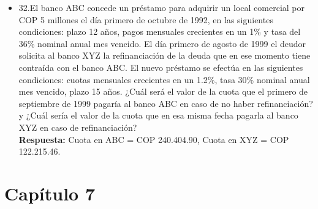 \begin{itemize}
 \item 32.El banco ABC concede un préstamo para adquirir un local comercial por COP 5 millones el día primero de octubre de 1992, en las siguientes condiciones: plazo 12 años, pagos mensuales crecientes en un 1\% y tasa del 36\% nominal anual mes vencido. El día primero de agosto de 1999 el deudor solicita al banco XYZ la refinanciación de la deuda que en ese momento tiene contraída con el banco ABC. El nuevo préstamo se efectúa en las siguientes condiciones: cuotas mensuales crecientes en un 1.2\%, tasa 30\% nominal anual mes vencido, plazo 15 años. ¿Cuál será el valor de la cuota que el primero de septiembre de 1999 pagaría al banco ABC en caso de no haber refinanciación? y ¿Cuál sería el valor de la cuota que en esa misma fecha pagarla al banco XYZ en caso de refinanciación?\\
       \textbf{Respuesta:} Cuota en ABC = COP 240.404.90, \hspace{1,0cm} Cuota en XYZ = COP 122.215.46.\\

\end{itemize}

\chapter*{Capítulo 7}




